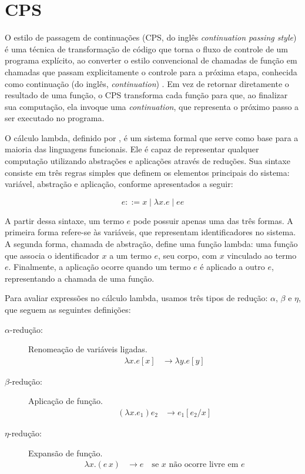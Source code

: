 \section{CPS}\label{sec:cps}

O estilo de passagem de continuações (CPS, do inglês \textit{continuation passing style}) é uma técnica de transformação de código que torna o fluxo de controle de um programa explícito, ao converter o estilo convencional de chamadas de função em chamadas que passam explicitamente o controle para a próxima etapa, conhecida como continuação (do inglês, \textit{continuation}) \cite{appel1992compiling}.
Em vez de retornar diretamente o resultado de uma função, o CPS transforma cada função para que, ao finalizar sua computação, ela invoque uma \textit{continuation}, que representa o próximo passo a ser executado no programa.

O cálculo lambda, definido por , é um sistema formal que serve como base para a maioria das linguagens funcionais.
Ele é capaz de representar qualquer computação utilizando abstrações e aplicações através de reduções.
Sua sintaxe consiste em três regras simples que definem os elementos principais do sistema: variável, abstração e aplicação, conforme apresentados a seguir:

\begin{equation} \label{eq:lambda-calculus}
  e ::= x \mid \lambda x. e \mid e e
\end{equation}

A partir dessa sintaxe, um termo $e$ pode possuir apenas uma das três formas.
A primeira forma refere-se às variáveis, que representam identificadores no sistema.
A segunda forma, chamada de abstração, define uma função lambda: uma função que associa o identificador $x$ a um termo $e$, seu corpo, com $x$ vinculado ao termo $e$.
Finalmente, a aplicação ocorre quando um termo $e$ é aplicado a outro $e$, representando a chamada de uma função.

Para avaliar expressões no cálculo lambda, usamos três tipos de redução: $\alpha$, $\beta$ e $\eta$, que seguem as seguintes definições:

\begin{description}
  \item[$\alpha$-redução:] Renomeação de variáveis ligadas.
        \begin{align}
          \lambda x . e[x] & \rightarrow \lambda y . e[y] \label{eq:alpha-reduction}
        \end{align}

  \item[$\beta$-redução:] Aplicação de função.
        \begin{align}
          (\lambda x . e_1) e_2 & \rightarrow e_1 [e_2 / x] \label{eq:beta-reduction}
        \end{align}

  \item[$\eta$-redução:] Expansão de função.
        \begin{align}
          \lambda x . (e \, x) & \rightarrow e \quad \text{se } x \text{ não ocorre livre em } e \label{eq:eta-reduction}
        \end{align}
\end{description}

